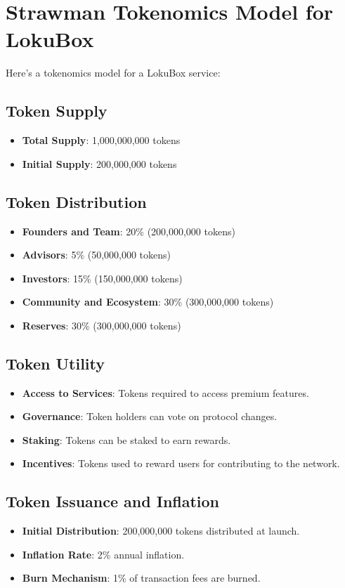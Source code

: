 \documentclass{tufte-handout}
\begin{document}
\section*{Strawman Tokenomics Model for LokuBox}

Here's a tokenomics model for a LokuBox service:

\subsection*{Token Supply}
\begin{itemize}
    \item \textbf{Total Supply}: 1,000,000,000 tokens
    \item \textbf{Initial Supply}: 200,000,000 tokens
\end{itemize}

\subsection*{Token Distribution}
\begin{itemize}
    \item \textbf{Founders and Team}: 20\% (200,000,000 tokens)
    \item \textbf{Advisors}: 5\% (50,000,000 tokens)
    \item \textbf{Investors}: 15\% (150,000,000 tokens)
    \item \textbf{Community and Ecosystem}: 30\% (300,000,000 tokens)
    \item \textbf{Reserves}: 30\% (300,000,000 tokens)
\end{itemize}

\subsection*{Token Utility}
\begin{itemize}
    \item \textbf{Access to Services}: Tokens required to access premium features.
    \item \textbf{Governance}: Token holders can vote on protocol changes.
    \item \textbf{Staking}: Tokens can be staked to earn rewards.
    \item \textbf{Incentives}: Tokens used to reward users for contributing to the network.
\end{itemize}

\subsection*{Token Issuance and Inflation}
\begin{itemize}
    \item \textbf{Initial Distribution}: 200,000,000 tokens distributed at launch.
    \item \textbf{Inflation Rate}: 2\% annual inflation.
    \item \textbf{Burn Mechanism}: 1\% of transaction fees are burned.
\end{itemize}
\end{document}
